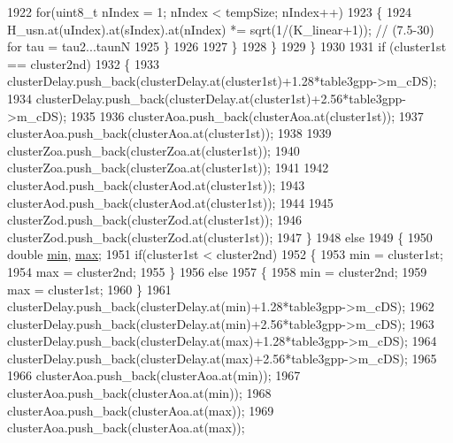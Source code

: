 \begin{DoxyCode}
1922                                 \textcolor{keywordflow}{for}(uint8\_t nIndex = 1; nIndex < tempSize; nIndex++)
1923                                 \{
1924                                         H\_usn.at(uIndex).at(sIndex).at(nIndex) *= sqrt(1/(K\_linear+1)); \textcolor{comment}{//
      (7.5-30) for tau = tau2...taunN}
1925                                 \}
1926 
1927                         \}
1928                 \}
1929         \}
1930 
1931         \textcolor{keywordflow}{if} (cluster1st == cluster2nd)
1932         \{
1933                 clusterDelay.push\_back(clusterDelay.at(cluster1st)+1.28*table3gpp->m\_cDS);
1934                 clusterDelay.push\_back(clusterDelay.at(cluster1st)+2.56*table3gpp->m\_cDS);
1935 
1936                 clusterAoa.push\_back(clusterAoa.at(cluster1st));
1937                 clusterAoa.push\_back(clusterAoa.at(cluster1st));
1938 
1939                 clusterZoa.push\_back(clusterZoa.at(cluster1st));
1940                 clusterZoa.push\_back(clusterZoa.at(cluster1st));
1941 
1942                 clusterAod.push\_back(clusterAod.at(cluster1st));
1943                 clusterAod.push\_back(clusterAod.at(cluster1st));
1944 
1945                 clusterZod.push\_back(clusterZod.at(cluster1st));
1946                 clusterZod.push\_back(clusterZod.at(cluster1st));
1947         \}
1948         \textcolor{keywordflow}{else}
1949         \{
1950                 \textcolor{keywordtype}{double} \hyperlink{80211b_8c_ac6afabdc09a49a433ee19d8a9486056d}{min}, \hyperlink{80211b_8c_affe776513b24d84b39af8ab0930fef7f}{max};
1951                 \textcolor{keywordflow}{if}(cluster1st < cluster2nd)
1952                 \{
1953                         min = cluster1st;
1954                         max = cluster2nd;
1955                 \}
1956                 \textcolor{keywordflow}{else}
1957                 \{
1958                         min = cluster2nd;
1959                         max = cluster1st;
1960                 \}
1961                 clusterDelay.push\_back(clusterDelay.at(min)+1.28*table3gpp->m\_cDS);
1962                 clusterDelay.push\_back(clusterDelay.at(min)+2.56*table3gpp->m\_cDS);
1963                 clusterDelay.push\_back(clusterDelay.at(max)+1.28*table3gpp->m\_cDS);
1964                 clusterDelay.push\_back(clusterDelay.at(max)+2.56*table3gpp->m\_cDS);
1965 
1966                 clusterAoa.push\_back(clusterAoa.at(min));
1967                 clusterAoa.push\_back(clusterAoa.at(min));
1968                 clusterAoa.push\_back(clusterAoa.at(max));
1969                 clusterAoa.push\_back(clusterAoa.at(max));

\end{DoxyCode}
